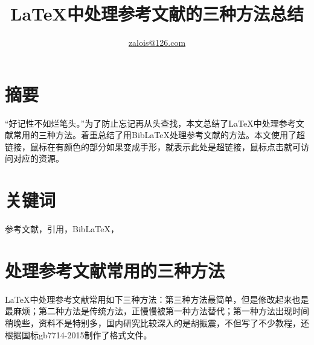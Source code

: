 \documentclass[cn,hazy,blue,14pt,geye,normal,]{elegantnote}
\title{\LaTeX{}中处理参考文献的三种方法总结}
\author{\href{mailto:zalois@126.com}{zalois@126.com}}
\date{\zhtoday}
\begin{document}
%
\maketitle
\section{摘要}
	``好记性不如烂笔头。''为了防止忘记再从头查找，本文总结了\LaTeX{}中处理参考文献常用的三种方法。着重总结了用Bib\LaTeX{}处理参考文献的方法。本文使用了超链接，鼠标在有颜色的部分如果变成手形，就表示此处是超链接，鼠标点击就可访问对应的资源。
\section{关键词}
	参考文献，引用，Bib\LaTeX{}，\BibTeX{}
\section{处理参考文献常用的三种方法}
\LaTeX{}中处理参考文献常用如下三种方法：第三种方法最简单，但是修改起来也是最麻烦；第二种方法是传统方法，正慢慢被第一种方法替代；第一种方法出现时间稍晚些，资料不是特别多，国内研究比较深入的是胡振震，不但写了不少教程\cite{HuShidong20200726,huzhengzheng20200602,hu_shidong2019}，还根据国标gb7714-2015制作了格式文件\cite{HuShidong20200726}。
\end{document}
